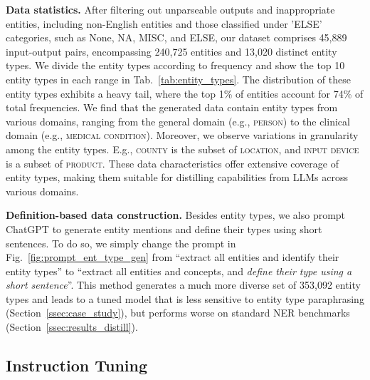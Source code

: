 \smallskip
\noindent\textbf{Data statistics.} After filtering out unparseable outputs and inappropriate entities, including non-English entities and those classified under 'ELSE' categories, such as None, NA, MISC, and ELSE, our dataset comprises 45,889 input-output pairs, encompassing 240,725 entities and 13,020 distinct entity types.
We divide the entity types according to frequency and show the top 10 entity types in each range in Tab.~\ref{tab:entity_types}.
The distribution of these entity types exhibits a heavy tail, where the top 1\% of entities account for 74\% of total frequencies.
We find that the generated data contain entity types from various domains, ranging from the general domain (e.g., \textsc{person}) to the clinical domain (e.g., \textsc{medical condition}).
Moreover, we observe variations in granularity among the entity types.
E.g., \textsc{county} is the subset of \textsc{location}, and \textsc{input device} is a subset of \textsc{product}.
These data characteristics offer extensive coverage of entity types, making them suitable for distilling capabilities from LLMs across various domains.

\smallskip
\noindent\textbf{Definition-based data construction.} Besides entity types, we also prompt ChatGPT to generate entity mentions and define their types using short sentences.
To do so, we simply change the prompt in Fig.~\ref{fig:prompt_ent_type_gen} from ``extract all entities and identify their entity types'' to ``extract all entities and concepts, and \emph{define their type using a short sentence}''.
This method generates a much more diverse set of 353,092 entity types and leads to a tuned model that is less sensitive to entity type paraphrasing (Section~\ref{ssec:case_study}), but performs worse on standard NER benchmarks (Section~\ref{ssec:results_distill}).

    

\subsection{Instruction Tuning}

